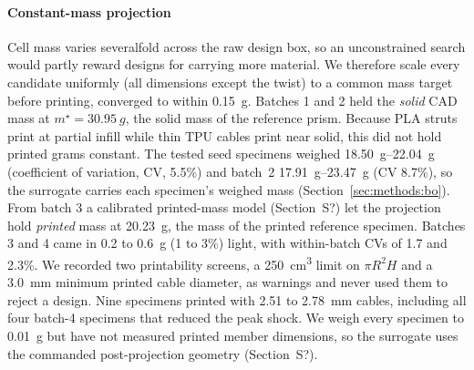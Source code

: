 \documentclass[11pt]{article}
\providecommand{\siref}[1]{S?}
\begin{document}
\paragraph{Constant-mass projection} Cell mass varies severalfold across
the raw design box, so an unconstrained search would partly reward
designs for carrying more material. We therefore scale every candidate
uniformly (all dimensions except the twist) to a common mass target
before printing, converged to within \SI{0.15}{g}. Batches 1 and 2 held
the \emph{solid} CAD mass at $m^{\star} = \SI{30.95}{g}$, the solid mass
of the reference prism. Because PLA struts print at partial infill while
thin TPU cables print near solid, this did not hold printed grams
constant. The tested seed specimens weighed \SIrange{18.50}{22.04}{g}
(coefficient of variation, CV, 5.5\%) and batch~2
\SIrange{17.91}{23.47}{g} (CV 8.7\%), so the surrogate carries each
specimen's weighed mass (Section~\ref{sec:methods:bo}). From batch 3 a
calibrated printed-mass model (Section~\siref{si:mass}) let the
projection hold \emph{printed} mass at \SI{20.23}{g}, the mass of the
printed reference specimen. Batches 3 and 4 came in 0.2 to \SI{0.6}{g}
(1 to 3\%) light, with within-batch CVs of 1.7 and 2.3\%. We recorded
two printability screens, a \SI{250}{cm^3} limit on $\pi R^2 H$ and a
\SI{3.0}{mm} minimum printed cable diameter, as warnings and never used
them to reject a design. Nine specimens printed with 2.51 to
\SI{2.78}{mm} cables, including all four batch-4 specimens that reduced
the peak shock. We weigh every specimen to \SI{0.01}{g} but have not
measured printed member dimensions, so the surrogate uses the commanded
post-projection geometry (Section~\siref{si:printability}).
\end{document}
